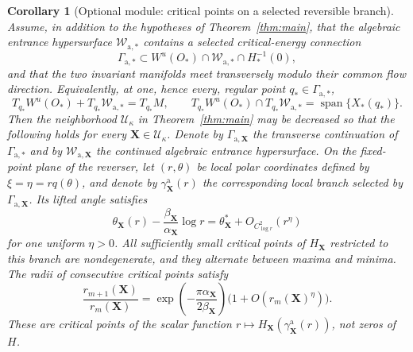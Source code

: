 \documentclass[11pt]{amsart}
\numberwithin{equation}{section}
\newtheorem{corollary}[theorem]{Corollary}
\theoremstyle{definition}
\theoremstyle{remark}
\newcommand{\cU}{\mathcal U}
\begin{document}
\begin{corollary}[Optional module: critical points on a selected reversible branch]
\label{cor:source-fold-persistence}
Assume, in addition to the hypotheses of Theorem~\ref{thm:main}, that the
algebraic entrance hypersurface $\mathcal W_{\mathrm a,*}$ contains a
selected critical-energy connection
\[
 \Gamma_{\mathrm a,*}\subset
 W^u(O_*)\cap\mathcal W_{\mathrm a,*}\cap H_*^{-1}(0),
\]
and that the two invariant manifolds meet transversely modulo their common
flow direction.  Equivalently, at one, hence every, regular point
$q_*\in\Gamma_{\mathrm a,*}$,
\[
 T_{q_*}W^u(O_*)+T_{q_*}\mathcal W_{\mathrm a,*}=T_{q_*}M,
 \qquad
 T_{q_*}W^u(O_*)\cap T_{q_*}\mathcal W_{\mathrm a,*}
 =\operatorname{span}\{X_*(q_*)\}.
\]
Then the neighborhood $\cU_\kappa$ in Theorem~\ref{thm:main} may be
decreased so that the following holds for every
$\mathbf X\in\cU_\kappa$.  Denote by
$\Gamma_{\mathrm a,\mathbf X}$ the transverse continuation of
$\Gamma_{\mathrm a,*}$ and by $\mathcal W_{\mathrm a,\mathbf X}$ the
continued algebraic entrance hypersurface.
On the fixed-point plane of the reverser, let $(r,\theta)$ be local polar
coordinates defined by $\xi=\eta=rq(\theta)$, and denote by
$\gamma_{\mathbf X}^{\mathrm a}(r)$ the corresponding local branch
selected by $\Gamma_{\mathrm a,\mathbf X}$.
Its lifted angle satisfies
\begin{equation}\label{eq:source-spiral}
 \theta_{\mathbf X}(r)
 -\frac{\beta_{\mathbf X}}{\alpha_{\mathbf X}}\log r
 =\theta_{\mathbf X}^*+O_{C^2_{\log r}}(r^\eta)
\end{equation}
for one uniform $\eta>0$.  All sufficiently small critical points of
$H_{\mathbf X}$ restricted to this branch are nondegenerate, and they
alternate between maxima and minima.  The radii of consecutive critical
points satisfy
\begin{equation}\label{eq:fold-ratio}
 \frac{r_{m+1}(\mathbf X)}{r_m(\mathbf X)}
 =\exp\!\left(-\frac{\pi\alpha_{\mathbf X}}
                       {2\beta_{\mathbf X}}\right)
     \bigl(1+O(r_m(\mathbf X)^\eta)\bigr).
\end{equation}
These are critical points of the scalar function
$r\mapsto H_{\mathbf X}(\gamma_{\mathbf X}^{\mathrm a}(r))$, not zeros
of $H$.
\end{corollary}
\end{document}
